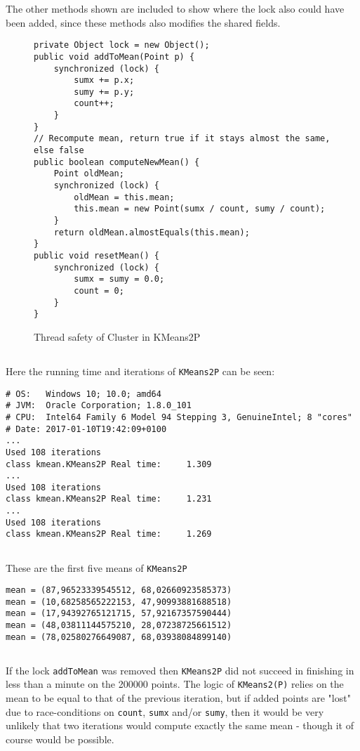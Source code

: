 The other methods shown are included to show where the lock also could have been added, since these methods also modifies the shared fields.

\begin{figure}
\begin{lstlisting}
private Object lock = new Object();
public void addToMean(Point p) {
    synchronized (lock) {
        sumx += p.x;
        sumy += p.y;
        count++;
    }
}
// Recompute mean, return true if it stays almost the same, else false
public boolean computeNewMean() {
    Point oldMean;
    synchronized (lock) {
        oldMean = this.mean;
        this.mean = new Point(sumx / count, sumy / count);
    }
    return oldMean.almostEquals(this.mean);
}
public void resetMean() {
    synchronized (lock) {
        sumx = sumy = 0.0;
        count = 0;
    }
}
\end{lstlisting}
\caption{Thread safety of Cluster in KMeans2P}
\label{code:2:4}
\end{figure}

\subsection{}
Here the running time and iterations of \texttt{KMeans2P} can be seen:
\begin{lstlisting}
# OS:   Windows 10; 10.0; amd64
# JVM:  Oracle Corporation; 1.8.0_101
# CPU:  Intel64 Family 6 Model 94 Stepping 3, GenuineIntel; 8 "cores"
# Date: 2017-01-10T19:42:09+0100
...
Used 108 iterations
class kmean.KMeans2P Real time:     1.309
...
Used 108 iterations
class kmean.KMeans2P Real time:     1.231
...
Used 108 iterations
class kmean.KMeans2P Real time:     1.269
\end{lstlisting}
\clearpage
\subsection{}
These are the first five means of \texttt{KMeans2P}
\begin{lstlisting}
mean = (87,96523339545512, 68,02660923585373)
mean = (10,68258565222153, 47,90993881688518)
mean = (17,94392765121715, 57,92167357590444)
mean = (48,03811144575210, 28,07238725661512)
mean = (78,02580276649087, 68,03938084899140)
\end{lstlisting}

\subsection{}
If the lock \texttt{addToMean} was removed then \texttt{KMeans2P} did not succeed in finishing in less than a minute on the 200000 points. The logic of \texttt{KMeans2(P)} relies on the mean to be equal to that of the previous iteration, but if added points are "lost" due to race-conditions on \texttt{count}, \texttt{sumx} and/or \texttt{sumy}, then it would be very unlikely that two iterations would compute exactly the same mean - though it of course would be possible.

